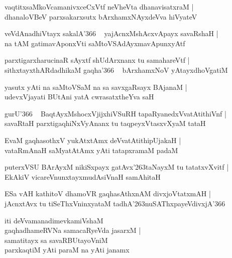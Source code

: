 \documentclass[twoside,12pt,openright]{book}
\def\S{\char'263}
\newcounter{shloka}[chapter]
\begin{document}
\begin{shloka}
vaqtitxsaMkoVcamanivxceCxVtf neVheVta dhanavisatxraM |\\
dhanaloVBeV parxsakarxsutx bArxhamxNAyxdeVva hiVyateV 
\end{shloka}

\begin{shloka}
veVdAnadhiVtayx sakalA\char'366 ~ yajAcnxMshAcxvApayx savaRshaH |\\
na tAM gatimavAponxVti saMtoVSAdAyxmavApunxyAtf 
\end{shloka}

\begin{shloka}
parxtigarxharucinaR sAyxtf shUdArxnanx tu samahareVtf |\\
sithxtayxthARdadhikaM gaqha\char'366 ~ bArxhamxNoV yAtayxdhoVgatiM 
\end{shloka}

\begin{shloka}
yasutx yAti na saMtoVSaM na sa savxgaRsayx BAjanaM |\\
udevxVjayati BUtAni yatA cwrasatxtheYva saH 
\end{shloka}

\begin{shloka}
gurU\char'366 ~ BaqtAyxMshocxVjijxhiVSuRH tapaRyanedxVvatAtithiVnf |\\
savaRtaH parxtigaqhiNxVyAnanx tu taqpeyxVtasxvXyaM tataH
\end{shloka}

\begin{shloka}
EvaM gaqhasothxV yukAtxtAmx deVvatAtithipUjakaH |\\
vataRmAnaH saMyatAtAmx yAti tatapxramaM padaM 
\end{shloka}

\begin{shloka}
puterxVSU BArAyxM nikiSxpayx gatAvx\S taNayxM  tu tatatxvXvitf |\\
EkAkiV vicareVnunxtayxmudAsiVnaH samAhitaH 
\end{shloka}

\begin{shloka}
ESa vAH kathitoV dhamoVR gaqhasAthxnAM divxjoVtatxmAH |\\
jAcnxtAvx tu tiSeThxVninxyataM tadhA\S nuSAThxpayeVdivxjA\char'366 
\end{shloka}

\begin{shloka}
iti deVvamanadimevkamiVshaM \\
gaqhadhameRVNa samacaRyeVda jasarxM |\\
samatitayx sa savaRBUtayoVniM \\
parxkaqtiM yAti paraM na yAti janamx
\end{shloka}
\end{document}
